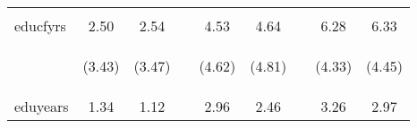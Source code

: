\documentclass{article}[11pt,subeqn]
\begin{document}
\begin{spacing}{1.5}
\begin{table}[ht]
\begin{center}
\begin{tabular}{lccp{5mm}ccp{5mm}cc}
\begin{footnotesize}\end{footnotesize}	&	\begin{footnotesize}\end{footnotesize}	&	\begin{footnotesize}\end{footnotesize}	&	\begin{footnotesize}\end{footnotesize} &	\begin{footnotesize}\end{footnotesize}	&	\begin{footnotesize}\end{footnotesize}	&	\begin{footnotesize}\end{footnotesize} &	\begin{footnotesize}\end{footnotesize}	&	\begin{footnotesize}\end{footnotesize}		\\
educfyrs	&	2.50	&	2.54	&	&	4.53	&	4.64	&	&	6.28	&	6.33		\\
\begin{footnotesize}\end{footnotesize}	& \begin{footnotesize} (3.43)\end{footnotesize} & \begin{footnotesize} (3.47)\end{footnotesize} & \begin{footnotesize} 	\end{footnotesize} & \begin{footnotesize} (4.62)\end{footnotesize} & \begin{footnotesize} (4.81)\end{footnotesize} & \begin{footnotesize} 	\end{footnotesize} & \begin{footnotesize} (4.33)\end{footnotesize} & \begin{footnotesize} (4.45)\end{footnotesize}	\\
eduyears	&	1.34	&	1.12	&	&	2.96	&	2.46	&	&	3.26	&	2.97		\\

\end{tabular}
\end{center}
\end{table}
\end{spacing}
\end{document}
